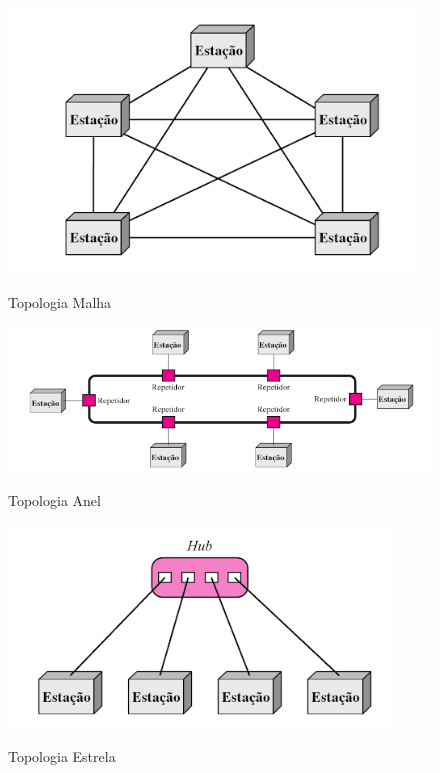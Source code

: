 \documentclass[	DIV=calc,%
							paper=a4,%
							fontsize=12pt,%
							onecolumn]{scrartcl}	 					%
\begin{document}
\begin{figure}[!htbp]
 	\centering
 	\includegraphics[width=\textwidth]{./imagens/malha.png}
 	\caption{Topologia Malha}
 	\cite{forouzan2007}
 	\label{fig:malha}
 \end{figure}

\begin{figure}[!htbp]
	\centering
	\includegraphics[width=\textwidth]{./imagens/anel.png}
	\caption{Topologia Anel}
	\cite{forouzan2007}
	\label{fig:anel}
\end{figure}
 
\begin{figure}[!htbp]
 	\centering
 	\includegraphics[width=\textwidth]{./imagens/estrela.png}
 	\caption{Topologia Estrela}
 	\cite{forouzan2007}
 	\label{fig:estrela}
 \end{figure}
\end{document}
